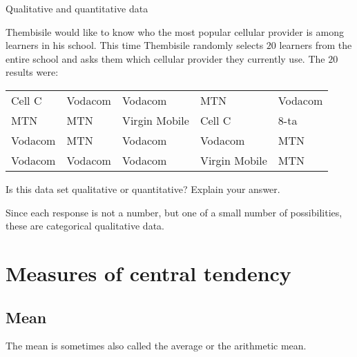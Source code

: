 \begin{wex}{Qualitative and quantitative data}{
    Thembisile would like to know who the most popular cellular
    provider is among learners in his school. This time Thembisile
    randomly selects $20$ learners from the entire school and asks them
    which cellular provider they currently use. The $20$ results were:

    \begin{center}
      \begin{tabular}{p{}p{}p{}p{}p{}}
        \toprule
        Cell C & Vodacom & Vodacom & MTN & Vodacom \\
        MTN & MTN & Virgin Mobile & Cell C & 8-ta \\
        Vodacom & MTN & Vodacom & Vodacom & MTN \\
        Vodacom & Vodacom & Vodacom & Virgin Mobile & MTN \\
        \bottomrule
      \end{tabular}
    \end{center}

    Is this data set qualitative or quantitative? Explain your answer.
}{
  Since each response is not a number, but one of a small number of
  possibilities, these are categorical qualitative data.

}
\end{wex}

\section{Measures of central tendency}

\subsection{Mean}

The mean is sometimes also called the average or the arithmetic mean.

